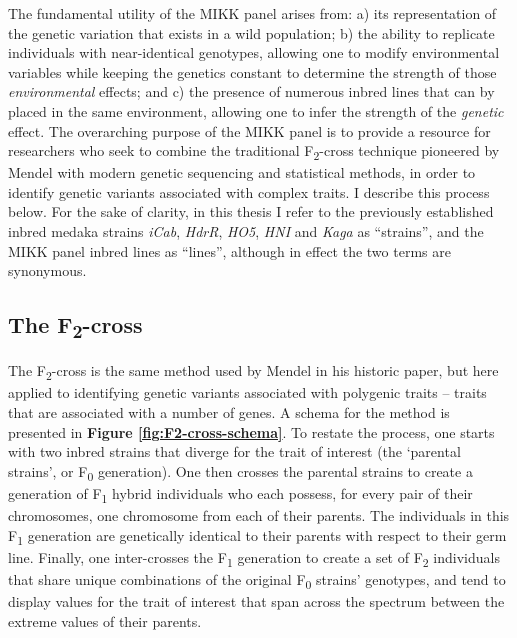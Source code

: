 \documentclass[
]{book}
\begin{document}
The fundamental utility of the MIKK panel arises from: a) its representation of the genetic variation that exists in a wild population; b) the ability to replicate individuals with near-identical genotypes, allowing one to modify environmental variables while keeping the genetics constant to determine the strength of those \emph{environmental} effects; and c) the presence of numerous inbred lines that can by placed in the same environment, allowing one to infer the strength of the \emph{genetic} effect. The overarching purpose of the MIKK panel is to provide a resource for researchers who seek to combine the traditional F\textsubscript{2}-cross technique pioneered by Mendel with modern genetic sequencing and statistical methods, in order to identify genetic variants associated with complex traits. I describe this process below. For the sake of clarity, in this thesis I refer to the previously established inbred medaka strains \emph{iCab}, \emph{HdrR}, \emph{HO5}, \emph{HNI} and \emph{Kaga} as ``strains'', and the MIKK panel inbred lines as ``lines'', although in effect the two terms are synonymous.

\hypertarget{the-f2-cross}{%
\subsection{\texorpdfstring{The F\textsubscript{2}-cross}{The F2-cross}}\label{the-f2-cross}}

The F\textsubscript{2}-cross is the same method used by Mendel in his historic paper, but here applied to identifying genetic variants associated with polygenic traits -- traits that are associated with a number of genes. A schema for the method is presented in \textbf{Figure \ref{fig:F2-cross-schema}}. To restate the process, one starts with two inbred strains that diverge for the trait of interest (the `parental strains', or F\textsubscript{0} generation). One then crosses the parental strains to create a generation of F\textsubscript{1} hybrid individuals who each possess, for every pair of their chromosomes, one chromosome from each of their parents. The individuals in this F\textsubscript{1} generation are genetically identical to their parents with respect to their germ line. Finally, one inter-crosses the F\textsubscript{1} generation to create a set of F\textsubscript{2} individuals that share unique combinations of the original F\textsubscript{0} strains' genotypes, and tend to display values for the trait of interest that span across the spectrum between the extreme values of their parents.
\end{document}
